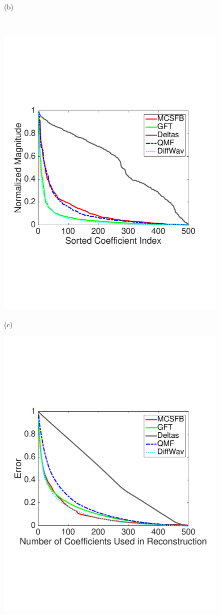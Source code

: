 \documentclass[journal, 10pt]{IEEEtran}
\begin{document}
\begin{figure}[tbh]
\begin{minipage}[m]{0.48\linewidth}
\centerline{\small{(b)}}
\end{minipage} \\
\vspace{.07in}
\begin{minipage}[m]{0.48\linewidth}
\centerline{\includegraphics[width=.86\linewidth]{fig_comp_coeff2}}
\centerline{\small{(c)}}
\end{minipage}
\begin{minipage}[m]{0.48\linewidth}
\centerline{\includegraphics[width=.88\linewidth]{fig_comp_error}}

\end{minipage}
\end{figure}
\end{document}
